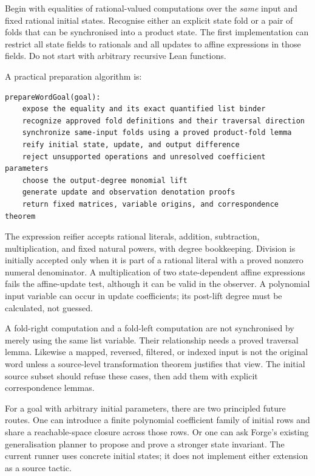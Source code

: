 Begin with equalities of rational-valued computations over the \emph{same}
 input and fixed rational initial states. Recognise either an
explicit state fold or a pair of folds that can be synchronised into a product
state. The first implementation can restrict all state fields to rationals and
all updates to affine expressions in those fields. Do not start with arbitrary
recursive Lean functions.

A practical preparation algorithm is:

\begin{lstlisting}
prepareWordGoal(goal):
    expose the equality and its exact quantified list binder
    recognize approved fold definitions and their traversal direction
    synchronize same-input folds using a proved product-fold lemma
    reify initial state, update, and output difference
    reject unsupported operations and unresolved coefficient parameters
    choose the output-degree monomial lift
    generate update and observation denotation proofs
    return fixed matrices, variable origins, and correspondence theorem
\end{lstlisting}

The expression reifier accepts rational literals, addition, subtraction,
multiplication, and fixed natural powers, with degree bookkeeping. Division is
initially accepted only when it is part of a rational literal with a proved
nonzero numeral denominator. A multiplication of two state-dependent affine
expressions fails the affine-update test, although it can be valid in the
observer. A polynomial input variable can occur in update coefficients; its
post-lift degree must be calculated, not guessed.

A fold-right computation and a fold-left computation are not synchronised by
merely using the same list variable. Their relationship needs a proved
traversal lemma. Likewise a mapped, reversed, filtered, or indexed input is not
the original word unless a source-level transformation theorem justifies that
view. The initial source subset should refuse these cases, then add them with
explicit correspondence lemmas.

For a goal with arbitrary initial parameters, there are two principled future
routes. One can introduce a finite polynomial coefficient family of initial
rows and share a reachable-space closure across those rows. Or one can ask
Forge's existing generalisation planner to propose and prove a stronger state
invariant. The current runner uses concrete initial states; it does not
implement either extension as a source tactic.

